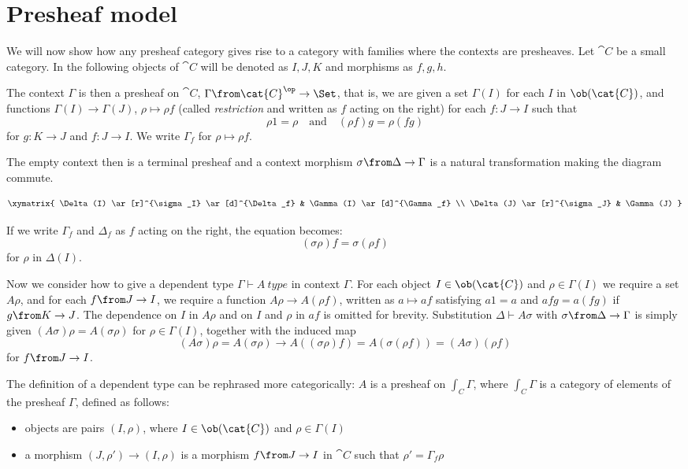 \section*{Presheaf model}

We will now show how any presheaf category gives rise to a category with
families where the contexts are presheaves.  Let $\cat{C}$ be a small category.
In the following objects of $\cat{C}$ will be denoted as $I,J,K$ and morphisms
as $f,g,h$.

The context $\Gamma$ is then a presheaf on $\cat{C}$, $\Gamma \from
\cat{C}^\op \to \Set$, that is, we are given a set $\Gamma(I)$ for each
$I$ in $\ob(\cat{C})$, and functions $\Gamma(I) \to \Gamma(J)$, $\rho \mapsto \rho
f$ (called \emph{restriction} and written as $f$ acting on the right) for each
$f: J \to I$ such that
\[
  \rho 1 = \rho \quad \text{and} \quad (\rho f) g = \rho (f g)
\]
for $g: K \to J$ and $f: J \to I$. We write $\Gamma_f$ for $\rho \mapsto \rho
f$.

The empty context then is a terminal presheaf and a context morphism $\sigma
\from \Delta \to \Gamma$ is a natural transformation making the diagram
commute.

\[
  \xymatrix{
    \Delta(I) \ar[r]^{\sigma_I} \ar[d]^{\Delta_f} & \Gamma(I) \ar[d]^{\Gamma_f} \\
    \Delta(J) \ar[r]^{\sigma_J} & \Gamma(J)
  }
\]

If we write $\Gamma_f$ and $\Delta_f$ as $f$ acting on the right, the
equation becomes:
\[
  (\sigma \rho) f = \sigma (\rho f)
\]
for $\rho$ in $\Delta(I)$.

Now we consider how to give a dependent type $\Gamma \vdash A~type$ in context
$\Gamma$. For each object $I \in \ob(\cat{C})$ and $\rho \in \Gamma(I)$ we require a
set $A \rho$, and for each $f \from J \to I$, we require a function $A \rho \to
A (\rho f)$, written as $a \mapsto af$ satisfying $a1 = a$ and $afg = a (f g)$
if $g \from K \to J$. The dependence on $I$ in $A\rho$ and on $I$ and $\rho$ in
$af$ is omitted for brevity. Substitution $\Delta \vdash A \sigma$ with $\sigma
\from \Delta \to \Gamma$ is simply given $(A \sigma) \rho = A (\sigma \rho)$
for $\rho \in \Gamma(I)$, together with the induced map
\[
  (A\sigma)\rho = A (\sigma \rho) \to A ((\sigma \rho)f) = A (\sigma (\rho f)) = (A \sigma) (\rho f)
\]
for $f \from J \to I$.

The definition of a dependent type can be rephrased more categorically: $A$ is
a presheaf on $\int_C \Gamma$, where $\int_C \Gamma$ is a category of elements
of the presheaf $\Gamma$, defined as follows:
\begin{itemize}
  \item objects are pairs $(I, \rho)$, where $I \in \ob(\cat{C})$ and $\rho \in
    \Gamma(I)$
  \item a morphism $(J, \rho') \to (I, \rho)$ is a morphism $f \from J \to I$
    in $\cat{C}$ such that $\rho' = \Gamma_f \rho$
\end{itemize}

